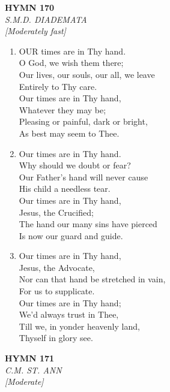 \documentclass[11pt,a4paper]{article}
\begin{document}
\newpage
\begin{center}
    {\Large \textbf{HYMN 170}}
    \\
    \textit{S.M.D. DIADEMATA}
    \\
    \textit{\small [Moderately fast]}
\end{center}
\vspace{1em}

\begin{enumerate}
    \item OUR times are in Thy hand. \\
        O God, we wish them there; \\
        Our lives, our souls, our all, we leave \\
        Entirely to Thy care. \\
        Our times are in Thy hand, \\
        Whatever they may be; \\
        Pleasing or painful, dark or bright, \\
        As best may seem to Thee.

    \item Our times are in Thy hand. \\
        Why should we doubt or fear? \\
        Our Father's hand will never cause \\
        His child a needless tear. \\
        Our times are in Thy hand, \\
        Jesus, the Crucified; \\
        The hand our many sins have pierced \\
        Is now our guard and guide.

    \item Our times are in Thy hand, \\
        Jesus, the Advocate, \\
        Nor can that hand be stretched in vain, \\
        For us to supplicate. \\
        Our times are in Thy hand; \\
        We'd always trust in Thee, \\
        Till we, in yonder heavenly land, \\
        Thyself in glory see.

\end{enumerate}

\newpage
\begin{center}
    {\Large \textbf{HYMN 171}}
    \\
    \textit{C.M. ST. ANN}
    \\
    \textit{\small [Moderate]}
\end{center}
\vspace{1em}
\end{document}
